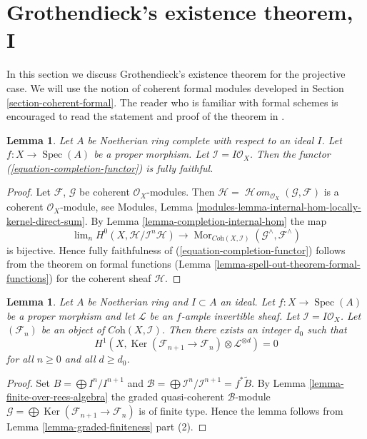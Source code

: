 \documentclass{stacks-project}
\theoremstyle{plain}
\newtheorem{lemma}[subsection]{Lemma}
\theoremstyle{definition}
\theoremstyle{remark}
\numberwithin{equation}{subsection}
\def\lim{\mathop{\mathrm{lim}}\nolimits}
\def\Spec{\mathop{\mathrm{Spec}}}
\def\SheafHom{\mathop{\mathcal{H}\!\mathit{om}}\nolimits}
\def\Mor{\mathop{\mathrm{Mor}}\nolimits}
\def\Ker{\mathop{\mathrm{Ker}}}
\begin{document}
\section{Grothendieck's existence theorem, I}
\label{section-existence}

\noindent
In this section we discuss Grothendieck's existence theorem for the
projective case. We will use the notion of coherent formal modules
developed in Section \ref{section-coherent-formal}. The reader who is familiar
with formal schemes is encouraged to read the statement and proof
of the theorem in \cite{EGA}.

\begin{lemma}
\label{lemma-fully-faithful}
Let $A$ be Noetherian ring complete with respect to an ideal $I$.
Let $f : X \to \Spec(A)$ be a proper morphism. Let
$\mathcal{I} = I\mathcal{O}_X$.
Then the functor (\ref{equation-completion-functor}) is fully faithful.
\end{lemma}

\begin{proof}
Let $\mathcal{F}$, $\mathcal{G}$ be coherent $\mathcal{O}_X$-modules.
Then $\mathcal{H} = \SheafHom_{\mathcal{O}_X}(\mathcal{G}, \mathcal{F})$
is a coherent $\mathcal{O}_X$-module, see
Modules, Lemma \ref{modules-lemma-internal-hom-locally-kernel-direct-sum}.
By Lemma \ref{lemma-completion-internal-hom} the map
$$
\lim_n H^0(X, \mathcal{H}/\mathcal{I}^n\mathcal{H})
\to
\Mor_{\textit{Coh}(X, \mathcal{I})}
(\mathcal{G}^\wedge, \mathcal{F}^\wedge)
$$
is bijective. Hence fully faithfulness of
(\ref{equation-completion-functor}) follows from the theorem on formal
functions (Lemma \ref{lemma-spell-out-theorem-formal-functions})
for the coherent sheaf $\mathcal{H}$.
\end{proof}

\begin{lemma}
\label{lemma-vanishing-projective}
Let $A$ be Noetherian ring and $I \subset A$ an ideal.
Let $f : X \to \Spec(A)$ be a proper morphism and let
$\mathcal{L}$ be an $f$-ample invertible sheaf. Let
$\mathcal{I} = I\mathcal{O}_X$. Let $(\mathcal{F}_n)$ be an
object of $\textit{Coh}(X, \mathcal{I})$. Then there exists an
integer $d_0$ such that
$$
H^1(X, \Ker(\mathcal{F}_{n + 1} \to \mathcal{F}_n)
\otimes \mathcal{L}^{\otimes d} )
= 0
$$
for all $n \geq 0$ and all $d \geq d_0$.
\end{lemma}

\begin{proof}
Set $B = \bigoplus I^n/I^{n + 1}$ and
$\mathcal{B} = \bigoplus \mathcal{I}^n/\mathcal{I}^{n + 1} = f^*\widetilde{B}$.
By Lemma \ref{lemma-finite-over-rees-algebra} the graded quasi-coherent
$\mathcal{B}$-module
$\mathcal{G} = \bigoplus \Ker(\mathcal{F}_{n + 1} \to \mathcal{F}_n)$
is of finite type. Hence the lemma follows from
Lemma \ref{lemma-graded-finiteness} part (2).
\end{proof}
\end{document}
